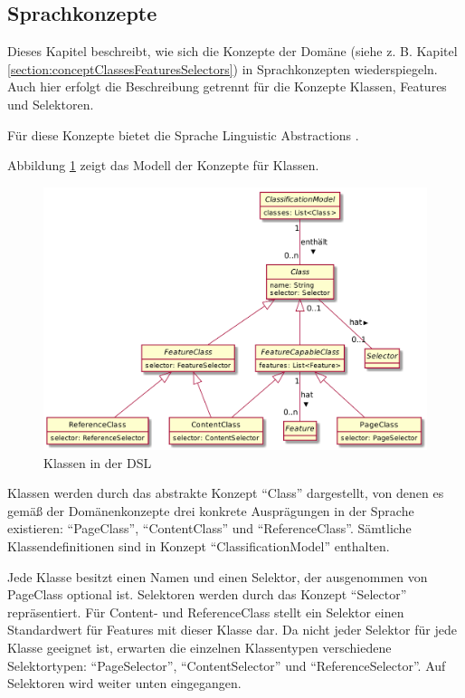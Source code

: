 \subsection{Sprachkonzepte}
    \label{solutionDetails:dslConcepts}
    Dieses Kapitel beschreibt, wie sich die Konzepte der Domäne
    (siehe z. B. Kapitel \ref{section:conceptClassesFeaturesSelectors})
    in Sprachkonzepten wiederspiegeln.
    Auch hier erfolgt die Beschreibung getrennt für die Konzepte Klassen,
    Features und Selektoren.

    Für diese Konzepte bietet die Sprache Linguistic Abstractions
    \cite[Kapitel 4.1, 4.1.2]{voelter:DslEngineering}.

    Abbildung \ref{image:dslClasses} zeigt das Modell der Konzepte für Klassen.

    \begin{figure}[htb]
        \centering
        \includegraphics[scale=\imageScalingFactor]{../resources/dsl/classes.png}
        \caption{Klassen in der DSL}
        \label{image:dslClasses}
    \end{figure}

    Klassen werden durch das abstrakte Konzept "`Class"' dargestellt,
    von denen es gemäß der Domänenkonzepte drei konkrete Ausprägungen in der Sprache
    existieren: "`PageClass"', "`ContentClass"' und "`ReferenceClass"'.
    Sämtliche Klassendefinitionen sind in Konzept "`ClassificationModel"' enthalten.

    Jede Klasse besitzt einen Namen und einen Selektor,
    der ausgenommen von PageClass optional ist.
    Selektoren werden durch das Konzept "`Selector"' repräsentiert.
    Für Content- und ReferenceClass stellt ein Selektor einen Standardwert
    für Features mit dieser Klasse dar.
    Da nicht jeder Selektor für jede Klasse geeignet ist,
    erwarten die einzelnen Klassentypen verschiedene Selektortypen:
    "`PageSelector"', "`ContentSelector"' und "`ReferenceSelector"'.
    Auf Selektoren wird weiter unten eingegangen.

